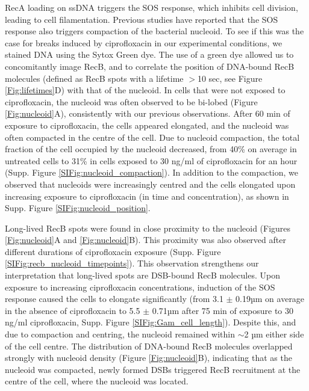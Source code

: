 RecA loading on ssDNA triggers the SOS response, which inhibits cell division, leading to cell filamentation. Previous studies have reported that the SOS response also triggers compaction of the bacterial nucleoid\cite{Odsbu2014}. To see if this was the case for breaks induced by ciprofloxacin in our experimental conditions, we stained DNA using the Sytox Green dye. The use of a green dye allowed us to concomitantly image RecB, and to correlate the position of DNA-bound RecB molecules (defined as RecB spots with a lifetime $>$10 sec, see Figure \ref{Fig:lifetimes}D) with that of the nucleoid. In cells that were not exposed to ciprofloxacin, the nucleoid was often observed to be bi-lobed (Figure \ref{Fig:nucleoid}A), consistently with our previous observations\cite{Lepore2023}. After 60 min of exposure to ciprofloxacin, the cells appeared elongated, and the nucleoid was often compacted in the centre of the cell. Due to nucleoid compaction, the total fraction of the cell occupied by the nucleoid decreased, from 40\% on average in untreated cells to 31\% in cells exposed to 30 ng/ml of ciprofloxacin for an hour (Supp. Figure \ref{SIFig:nucleoid_compaction}). In addition to the compaction, we observed that nucleoids were increasingly centred and the cells elongated upon increasing exposure to ciprofloxacin (in time and concentration), as shown in Supp. Figure \ref{SIFig:nucleoid_position}.

Long-lived RecB spots were found in close proximity to the nucleoid (Figures \ref{Fig:nucleoid}A and \ref{Fig:nucleoid}B). This proximity was also observed after different durations of ciprofloxacin exposure (Supp. Figure \ref{SIFig:recb_nucleoid_timepoints}). This observation strengthens our interpretation that long-lived spots are DSB-bound RecB molecules. Upon exposure to increasing ciprofloxacin concentrations, induction of the SOS response caused the cells to elongate significantly (from 3.1 $\pm$ 0.19µm on average in the absence of ciprofloxacin to 5.5 $\pm$ 0.71µm after 75 min of exposure to 30 ng/ml ciprofloxacin, Supp. Figure \ref{SIFig:Gam_cell_length}). Despite this, and due to compaction and centring, the nucleoid remained within $\sim$2 µm either side of the cell centre. The distribution of DNA-bound RecB molecules overlapped strongly with nucleoid density (Figure \ref{Fig:nucleoid}B), indicating that as the nucleoid was compacted, newly formed DSBs triggered RecB recruitment at the centre of the cell, where the nucleoid was located.

